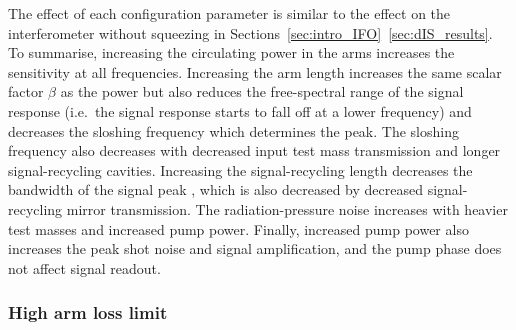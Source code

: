 The effect of each configuration parameter is similar to the effect on the interferometer without squeezing in Sections~\ref{sec:intro_IFO}~\ref{sec:dIS_results}. To summarise, increasing the circulating power in the arms increases the sensitivity at all frequencies. Increasing the arm length increases the same scalar factor $\beta$ as the power but also reduces the free-spectral range of the signal response (i.e.\ the signal response starts to fall off at a lower frequency) and decreases the sloshing frequency which determines the peak. The sloshing frequency also decreases with decreased input test mass transmission and longer signal-recycling cavities. Increasing the signal-recycling length decreases the bandwidth of the signal peak , which is also decreased by decreased signal-recycling mirror transmission. The radiation-pressure noise increases with heavier test masses and increased pump power. Finally, increased pump power also increases the peak shot noise and signal amplification, and the pump phase does not affect signal readout. 


\subsubsection{High arm loss limit}
\label{sec:nOPO_reduction}


